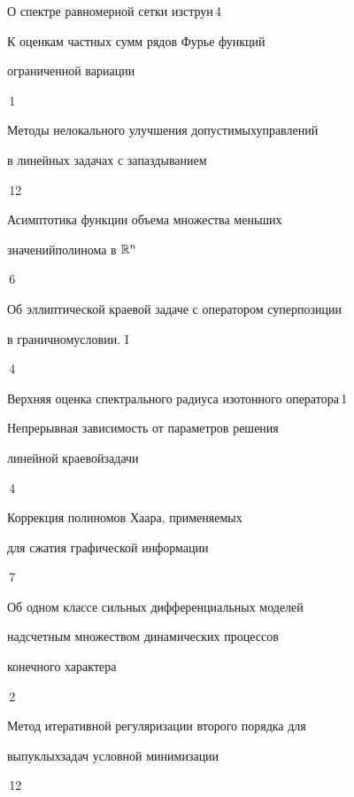 {О спектре равномерной сетки из\newline струн}{\No\,4}




{К оценкам частных сумм рядов Фурье функций\newline 


ограниченной вариации}{\No\,1}




{Методы нелокального улучшения допустимых\newline управлений


в линейных задачах с запаздыванием}{\No\,12}




{Асимптотика функции объема множества меньших


значений\newline полинома в $\Bbb R^n$}{\No\,6}




{Об эллиптической краевой задаче с оператором суперпозиции  


в граничном\newline условии. I}{\No\,4}




{Верхняя оценка спектрального радиуса изотонного оператора}{\No\,1}




{Непрерывная зависимость от параметров решения


линейной краевой\newline задачи}{\No\,4}




{Коррекция полиномов Хаара, применяемых \newline


для сжатия графической информации}{\No\,7}




{Об одном классе сильных дифференциальных моделей  


над\newline счетным множеством динамических процессов  


конечного характера}{\No\,2}




{Метод итеративной регуляризации второго порядка для


выпуклых\newline задач условной минимизации}{\No\,12}


